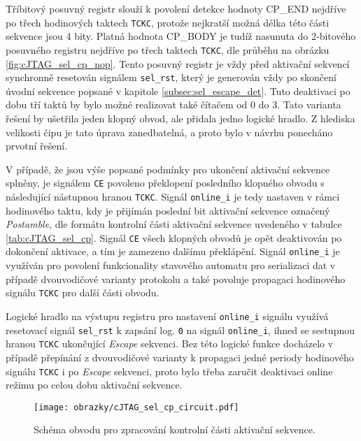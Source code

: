 Tříbitový posuvný registr slouží k povolení detekce hodnoty CP\_END nejdříve po třech hodinových taktech \texttt{\acs{TCKC}}, protože nejkratší možná délka této části sekvence jsou 4 bity. Platná hodnota CP\_BODY je tudíž nasunuta do 2-bitového posuvného registru nejdříve po třech taktech \texttt{\acs{TCKC}}, dle průběhu na obrázku \ref{fig:cJTAG_sel_cp_nop}. Tento posuvný registr je vždy před aktivační sekvencí synchronně resetován signálem \texttt{sel\_rst}, který je generován vždy po skončení úvodní sekvence popsané v kapitole \ref{subsec:sel_escape_det}. Tuto deaktivaci po dobu tří taktů by bylo možné realizovat také čítačem od 0 do 3. Tato varianta řešení by ušetřila jeden klopný obvod, ale přidala jedno logické hradlo. Z hlediska velikosti čipu je tato úprava zanedbatelná, a proto bylo v návrhu ponecháno prvotní řešení.

V případě, že jsou výše popsané podmínky pro ukončení aktivační sekvence splněny, je signálem \texttt{CE} povoleno překlopení posledního klopného obvodu s následující nástupnou hranou \texttt{\acs{TCKC}}. Signál \texttt{online\_i} je tedy nastaven v rámci hodinového taktu, kdy je přijímán poslední bit aktivační sekvence označený \textit{Postamble}, dle formátu kontrolní části aktivační sekvence uvedeného v tabulce \ref{tab:cJTAG_sel_cp}. Signál \texttt{CE} všech klopných obvodů je opět deaktivován po dokončení aktivace, a tím je zamezeno dalšímu překlápění. Signál \texttt{online\_i} je využíván pro povolení funkcionality stavového automatu pro serializaci dat v případě dvouvodičové varianty protokolu a také povoluje propagaci hodinového signálu \texttt{\acs{TCKC}} pro další části obvodu. 

Logické hradlo na výstupu registru pro nastavení \texttt{online\_i} signálu využívá resetovací signál \texttt{sel\_rst} k zapsání log. \texttt{0} na signál \texttt{online\_i}, ihned se sestupnou hranou \texttt{\acs{TCKC}} ukončující \textit{Escape} sekvenci. Bez této logické funkce docházelo v případě přepínání z dvouvodičové varianty k propagaci jedné periody hodinového signálu \texttt{\acs{TCKC}} i po \textit{Escape} sekvenci, proto bylo třeba zaručit deaktivaci online režimu po celou dobu aktivační sekvence.

\begin{figure}[H]
  \begin{center}
    \texttt{[image: obrazky/cJTAG\_sel\_cp\_circuit.pdf]}
  \end{center}
  \caption{Schéma obvodu pro zpracování kontrolní části aktivační sekvence.}
	\label{fig:cJTAG_sel_cp_circuit}
\end{figure}


